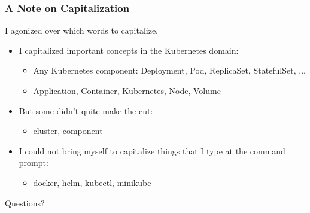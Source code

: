 \begin{frame}
\frametitle{A Note on Capitalization}
I agonized over which words to capitalize.
\begin{itemize}
   \item{I capitalized important concepts in the Kubernetes domain:}
   \begin{itemize}
      \item{Any Kubernetes component: Deployment, Pod, ReplicaSet, StatefulSet, ...}
      \item{Application, Container, Kubernetes, Node, Volume}
   \end{itemize}

   \item{But some didn't quite make the cut:}
   \begin{itemize}
      \item{cluster, component}
   \end{itemize}

   \item{I could not bring myself to capitalize things that I type at the command prompt:}
   \begin{itemize}
      \item{docker, helm, kubectl, minikube}
   \end{itemize}
\end{itemize}
\end{frame}

\begin{frame}
    \begin{center}
        \Huge Questions?
    \end{center}
\end{frame}


